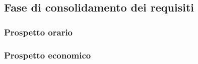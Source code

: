 \subsection{Fase di consolidamento dei requisiti}
	\subsubsection{Prospetto orario}
	\subsubsection{Prospetto economico}	